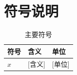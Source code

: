 \section{符号说明}
\begin{table}[!htbp]\centering\caption{主要符号}\label{tab:symbols}
\begin{tabular}{lll}\toprule 符号 & 含义 & 单位\\\midrule $x$ & [含义] & [单位]\\\bottomrule\end{tabular}
\end{table}
